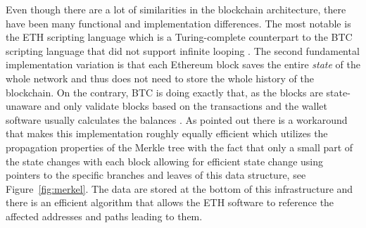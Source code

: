 Even though there are a lot of similarities in the blockchain architecture, 
there have been many functional and implementation differences. The most notable
is the \ac{ETH} scripting language which is a Turing-complete counterpart
to the \ac{BTC} scripting language that did not support infinite looping 
\cite[see Chapter Scripting]{buterin2013ethereum}. The second fundamental 
implementation variation is that each Ethereum block saves the entire 
\textit{state} of the whole network and thus does not need to store
the whole history of the blockchain. On the contrary, \ac{BTC} 
is doing exactly that, as the blocks are state-unaware and only validate blocks
based on the transactions and the wallet software usually
calculates the balances \cite[see Chapter 2]{Tikhomirov2018}. 
As \cite{buterin2013ethereum} pointed out there
is a workaround that makes this implementation roughly equally efficient 
which utilizes the propagation properties of the Merkle tree with the fact
that only a small part of the state changes with each block allowing for
efficient state change using pointers to the specific branches and leaves of 
this data structure, see Figure~\ref{fig:merkel}. The data are stored
at the bottom of this infrastructure and there is an efficient algorithm
that allows the \ac{ETH} software to reference the affected addresses and paths
leading to them.


